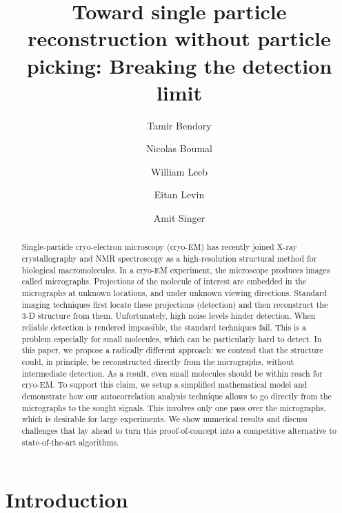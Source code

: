 \documentclass[12pt]{article}
\newcommand{\1}{\mathbf{1}}
\theoremstyle{plain}
\theoremstyle{definition}
\theoremstyle{remark}
\theoremstyle{plain}
\theoremstyle{remark}
\theoremstyle{plain}
\theoremstyle{plain}
\begin{document}


\title{Toward single particle reconstruction without particle picking: Breaking the detection limit}

\author[a]{Tamir Bendory}
\author[b]{Nicolas Boumal} 
\author[c]{William Leeb}
\author[a,b]{Eitan Levin}
\author[a,b]{Amit Singer}


\maketitle



\begin{abstract}
Single-particle cryo-electron microscopy (cryo-EM) has recently joined X-ray crystallography
and NMR spectroscopy as a high-resolution structural method for biological macromolecules.
In a cryo-EM experiment, the microscope produces images called micrographs. Projections of the molecule of interest are embedded in the micrographs at unknown locations, and under unknown viewing directions. Standard imaging techniques first locate these projections (detection) and then reconstruct the 3-D structure from them. Unfortunately, high noise levels hinder detection. When reliable detection is rendered impossible, the standard techniques fail. This is a problem especially for small molecules, which can be particularly hard to detect. In this paper, we propose a radically different approach: we contend that the structure could, in principle, be reconstructed directly from the micrographs, without intermediate detection. 
As a result, even small molecules should be within reach for cryo-EM. To support this claim, we setup a simplified mathematical model and demonstrate how our autocorrelation analysis technique allows to go directly from the micrographs to the sought signals. This involves only one pass over the micrographs, which is desirable for large experiments. 
We show numerical results and  discuss challenges that lay ahead to turn this proof-of-concept into a competitive alternative to state-of-the-art algorithms.
\end{abstract}

\section{Introduction}
\end{document}
